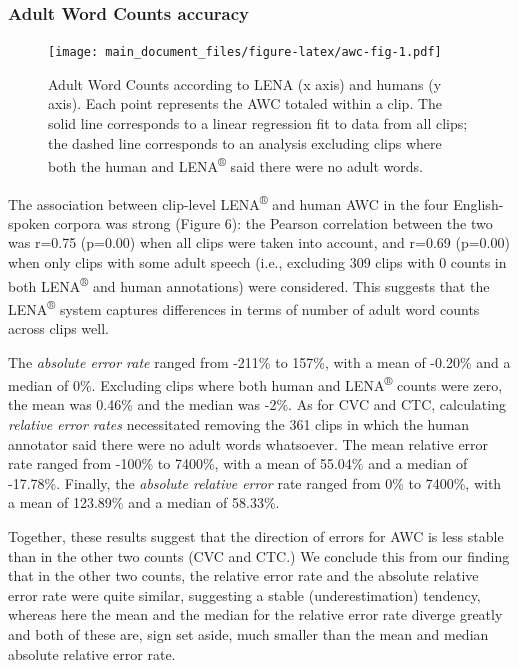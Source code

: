 \documentclass[english,floatsintext,man]{apa6}
\begin{document}
\subsubsection{Adult Word Counts
accuracy}\label{adult-word-counts-accuracy}

\begin{figure}
\centering
\texttt{[image: main\_document\_files/figure-latex/awc-fig-1.pdf]}
\caption{\label{fig:awc-fig}Adult Word Counts according to LENA (x axis) and
humans (y axis). Each point represents the AWC totaled within a clip.
The solid line corresponds to a linear regression fit to data from all
clips; the dashed line corresponds to an analysis excluding clips where
both the human and LENA\textsuperscript{®} said there were no adult
words.}
\end{figure}

The association between clip-level LENA\textsuperscript{®} and human AWC
in the four English-spoken corpora was strong (Figure 6): the Pearson
correlation between the two was r=0.75 (p=0.00) when all clips were
taken into account, and r=0.69 (p=0.00) when only clips with some adult
speech (i.e., excluding 309 clips with 0 counts in both
LENA\textsuperscript{®} and human annotations) were considered. This
suggests that the LENA\textsuperscript{®} system captures differences in
terms of number of adult word counts across clips well.

The \emph{absolute error rate} ranged from -211\% to 157\%, with a mean
of -0.20\% and a median of 0\%. Excluding clips where both human and
LENA\textsuperscript{®} counts were zero, the mean was 0.46\% and the
median was -2\%. As for CVC and CTC, calculating \emph{relative error
rates} necessitated removing the 361 clips in which the human annotator
said there were no adult words whatsoever. The mean relative error rate
ranged from -100\% to 7400\%, with a mean of 55.04\% and a median of
-17.78\%. Finally, the \emph{absolute relative error} rate ranged from
0\% to 7400\%, with a mean of 123.89\% and a median of 58.33\%.

Together, these results suggest that the direction of errors for AWC is
less stable than in the other two counts (CVC and CTC.) We conclude this
from our finding that in the other two counts, the relative error rate
and the absolute relative error rate were quite similar, suggesting a
stable (underestimation) tendency, whereas here the mean and the median
for the relative error rate diverge greatly and both of these are, sign
set aside, much smaller than the mean and median absolute relative error
rate.
\end{document}
